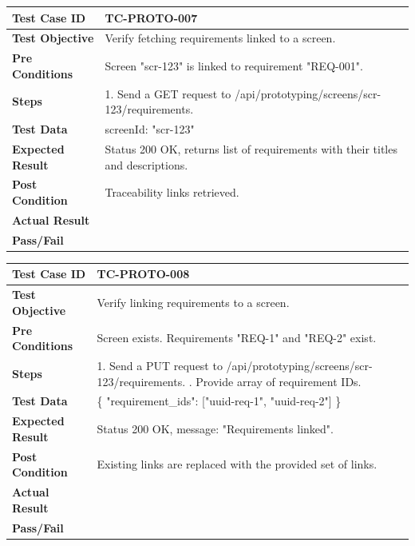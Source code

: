 \begin{longtable}{|p{}|p{}|}
\hline
\textbf{Test Case ID} & TC-PROTO-007 \\ \hline
\textbf{Test Objective} & Verify fetching requirements linked to a screen. \\ \hline
\textbf{Pre Conditions} & Screen "scr-123" is linked to requirement "REQ-001". \\ \hline
\textbf{Steps} & 
1. Send a GET request to /api/prototyping/screens/scr-123/requirements. \\ \hline
\textbf{Test Data} & screenId: "scr-123" \\ \hline
\textbf{Expected Result} & Status 200 OK, returns list of requirements with their titles and descriptions. \\ \hline
\textbf{Post Condition} & Traceability links retrieved. \\ \hline
\textbf{Actual Result} &  \\ \hline
\textbf{Pass/Fail} &  \\ \hline
\end{longtable}

\begin{longtable}{|p{}|p{}|}
\hline
\textbf{Test Case ID} & TC-PROTO-008 \\ \hline
\textbf{Test Objective} & Verify linking requirements to a screen. \\ \hline
\textbf{Pre Conditions} & Screen exists. Requirements "REQ-1" and "REQ-2" exist. \\ \hline
\textbf{Steps} & 
1. Send a PUT request to /api/prototyping/screens/scr-123/requirements. \newline
2. Provide array of requirement IDs. \\ \hline
\textbf{Test Data} & \{ "requirement\_ids": ["uuid-req-1", "uuid-req-2"] \} \\ \hline
\textbf{Expected Result} & Status 200 OK, message: "Requirements linked". \\ \hline
\textbf{Post Condition} & Existing links are replaced with the provided set of links. \\ \hline
\textbf{Actual Result} &  \\ \hline
\textbf{Pass/Fail} &  \\ \hline
\end{longtable}


